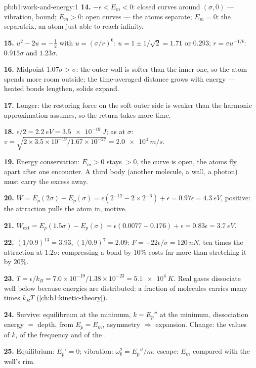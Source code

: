 \begin{solution}{pb:b1:work-and-energy:1}
\textbf{14.} $-\epsilon < E_m < 0$: closed curves around $(\sigma, 0)$ ---
vibration, bound; $E_m > 0$: open curves --- the atoms separate;
$E_m = 0$: the separatrix, an atom just able to reach infinity.

\textbf{15.} $u^2 - 2u = -\tfrac12$ with $u = (\sigma/r)^6$: $u = 1 \pm 1/\sqrt2
= 1.71$ or $0.293$; $r = \sigma u^{-1/6}$: $0.915\sigma$ and $1.23\sigma$.

\textbf{16.} Midpoint $1.07\sigma > \sigma$: the outer wall is softer than
the inner one, so the atom spends more room outside; the time-averaged
distance grows with energy --- heated bonds lengthen, solids expand.

\textbf{17.} Longer: the restoring force on the soft outer side is
weaker than the harmonic approximation assumes, so the return takes
more time.

\textbf{18.} $\epsilon/2 = \qty{2.2}{eV} = \qty{3.5e-19}{J}$; as  at $\sigma$: $v = \sqrt{2 \times 3.5\times10^{-19}/1.67\times10^{-27}}
= \qty{2.0e4}{m/s}$.

\textbf{19.} Energy conservation: $E_m > 0$ stays $> 0$, the curve is
open, the atoms fly apart after one encounter. A third body (another
molecule, a wall, a photon) must carry the excess away.

\textbf{20.} $W = E_p(2\sigma) - E_p(\sigma) = \epsilon(2^{-12} - 2 \times 2^{-6})
+ \epsilon = 0.97\epsilon = \qty{4.3}{eV}$, positive: the attraction pulls
the atom in, motive.

\textbf{21.} $W_{\text{ext}} = E_p(1.5\sigma) - E_p(\sigma) = \epsilon(0.0077 -
0.176) + \epsilon = 0.83\epsilon = \qty{3.7}{eV}$.

\textbf{22.} $(1/0.9)^{13} = 3.93$, $(1/0.9)^7 = 2.09$: $F = +22\epsilon/\sigma
= \qty{+120}{nN}$, ten times the attraction at $1.2\sigma$: compressing a
bond by $10\%$ costs far more than stretching it by $20\%$.

\textbf{23.} $T = \epsilon/k_B = 7.0\times10^{-19}/1.38\times10^{-23} =
\qty{5.1e4}{K}$. Real gases dissociate well below because energies are
distributed: a fraction of molecules carries many times $k_BT$
(\cref{ch:b1:kinetic-theory}).

\textbf{24.} Survive: equilibrium at the minimum, $k = E_p''$ at the
minimum, dissociation energy $=$ depth,  from $E_p = E_m$,
asymmetry $\Rightarrow$ expansion. Change: the values of $k$, of the
frequency and of the .

\textbf{25.} Equilibrium: $E_p' = 0$; vibration: $\omega_0^2 = E_p''/m$;
escape: $E_m$ compared with the well's rim.
\end{solution}
